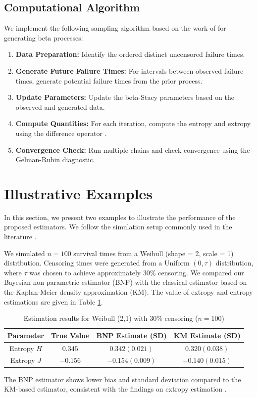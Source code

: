 \documentclass[twoside]{article}
\begin{document}
\subsection{Computational Algorithm}
We implement the following sampling algorithm based on the work of
\citep{9} 
for generating beta processes: 
\begin{enumerate}
\item
\textbf{Data Preparation:}
Identify the ordered distinct uncensored failure times. 
\item
\textbf{Generate Future Failure Times:}
For intervals between observed failure times, generate potential failure times from the prior process. 
\item
\textbf{Update Parameters:}
Update the beta-Stacy parameters based on the observed and generated data. 
\item
\textbf{Compute Quantities:}
For each iteration, compute the entropy and extropy using the difference operator
\citep{7}. 
\item
\textbf{Convergence Check:}
Run multiple chains and check convergence using the Gelman-Rubin diagnostic. 
\end{enumerate}


\section{Illustrative Examples}
In this section, we present two examples to illustrate the performance of the proposed estimators. 
We follow the simulation setup commonly used in the literature 
\citep{3,13}. 

\begin{eg}
\label{eg1}
We simulated 
$n = 100$ 
survival times from a Weibull (shape = 2, scale = 1) distribution. 
Censoring times were generated from a Uniform 
$(0, \tau)$ 
distribution, where 
$\tau$
was chosen to achieve approximately 
$30\%$ 
censoring. 
We compared our Bayesian non-parametric estimator (BNP) with the classical estimator based on the Kaplan-Meier density approximation (KM).
The value of extropy and entropy estimations are given in Table
\ref{ExtroEntoTbl}.
\begin{table}[h!]
\centering
\begin{tabular}{|c|c c c|}
\hline
Parameter & True Value & BNP Estimate (SD) & KM Estimate (SD) 
\\
\hline
\hline
Entropy $H$ & $0.345$ & $0.342 (0.021)$ & $0.320 (0.038)$
\\ 
Extropy $J$ & $-0.156$ & $-0.154 (0.009)$ & $-0.140 (0.015)$
\\
\hline
\end{tabular}
\caption{Estimation results for Weibull (2,1) with $30\%$ censoring ($n=100$) }
\label{ExtroEntoTbl}
\end{table}
The BNP estimator shows lower bias and standard deviation compared to the KM-based estimator, consistent with the findings on extropy estimation
\citep{1}.
\end{eg}
\end{document}
